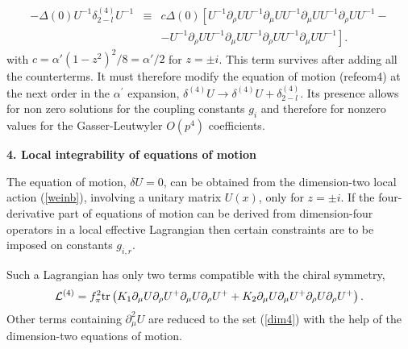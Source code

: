 \documentclass[a4paper,12pt]{article}
\begin{document}
\begin{eqnarray}
- \Delta(0) U^{-1} \delta^{(4)}_{2-l} U^{-1} &\equiv&  c \Delta(0)\left[ 
U^{-1}
 \partial_{\rho} U  U^{-1} \partial_\mu U  
U^{-1} \partial_\mu U  U^{-1}\partial_{\rho} U  U^{-1} -\right.\nonumber\\
&&\left.- U^{-1} 
 \partial_{\rho} U  U^{-1} \partial_\mu U  U^{-1} \partial_\rho U  U^{-1}\partial_{\mu} U  U^{-1}\right].
\label{dfive}
\end{eqnarray}
with $c = \alpha'(1-z^2)^2/8 = \alpha'/2$ for $z = \pm i$.
This term survives after adding all the counterterms.
It must therefore modify
the equation of motion (ref{eom4}) at the next order in the $\alpha^\prime$ expansion,
$\delta^{(4)}U \rightarrow 
\delta^{(4)} U +  \delta^{(4)}_{2-l}$. Its presence
allows for non zero solutions for the coupling constants 
$g_i$ and therefore for nonzero values for the
Gasser-Leutwyler $O(p^4)$ coefficients.\\

\centerline{\large\bf 4. Local integrability of equations of motion}

\medskip 

The equation of motion, $\delta U = 0$, 
can be obtained from the dimension-two local action 
(\ref{weinb}), 
involving 
a unitary matrix $U(x)$, only for $z=\pm i$.
If the four-derivative part of equations of motion 
can be derived from dimension-four operators in a local effective 
Lagrangian
then certain constraints are to be imposed on constants $g_{i,r}$.

Such a Lagrangian has only two terms compatible with 
the chiral symmetry,
\begin{equation}
{\cal L}^{(4)} = f_\pi^2 \mbox{tr}\left( K_1 \partial_\mu U \partial_\rho  
U^+ \partial_{\mu} U \partial_{\rho} U^+ 
+ K_2  \partial_\mu U \partial_{\mu} U^+ \partial_{\rho} U  
\partial_{\rho} U^+ \right). \label{dim4}
\end{equation}
Other terms containing $\partial_\mu^2 U$ are reduced to the set (\ref{dim4}) 
with the help  
of  the dimension-two equations of motion.
\end{document}

